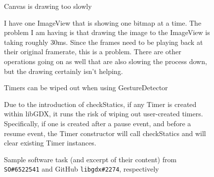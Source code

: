 
\begin{figure}
\centering
\begin{frameEnv}{{\small Canvas is drawing too slowly}}
\begin{small}
    I have one ImageView that is showing one bitmap at a time. The problem I am having is that drawing the image to the ImageView is taking roughly 30ms. Since the frames need to be playing back at their original framerate, this is a problem. There are other operations going on as well that are also slowing the process down, but the drawing certainly isn't helping.
\end{small}
\end{frameEnv}
\smallskip
\begin{frameEnv}{{Timers can be wiped out when using GestureDetector}}
\begin{small}
    Due to the introduction of checkStatics, if any Timer is created within libGDX, it runs the risk of wiping out user-created timers. Specifically, if one is created after a pause event, and before a resume event, the Timer constructor will call checkStatics and will clear existing Timer instances.
\end{small}        
\end{frameEnv}
\caption{Sample software task (and excerpt of their content) from \texttt{SO\#6522541} and GitHub \texttt{libgdx\#2274}, respectively}
\label{fig:cp4:sample-tasks}
\end{figure}
    
